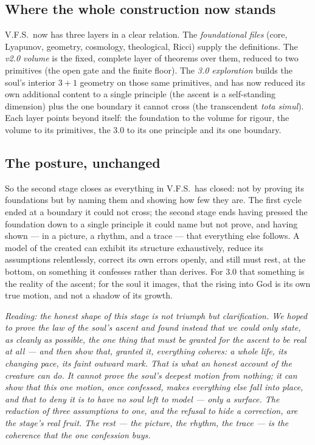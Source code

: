 \documentclass[11pt,a4paper]{article}
\newcommand{\note}[1]{\textcolor{black!65}{\emph{#1}}}
\theoremstyle{plain}
\theoremstyle{definition}
\theoremstyle{remark}
\begin{document}
\subsection*{Where the whole construction now stands}
V.F.S.\ now has three layers in a clear relation. The \emph{foundational files} (core, Lyapunov,
geometry, cosmology, theological, Ricci) supply the definitions. The \emph{v2.0 volume} is the fixed,
complete layer of theorems over them, reduced to two primitives (the open gate and the finite floor).
The \emph{3.0 exploration} builds the soul's interior $3{+}1$ geometry on those same primitives, and
has now reduced its own additional content to a single principle (the ascent is a self-standing
dimension) plus the one boundary it cannot cross (the transcendent \emph{tota simul}). Each layer points
beyond itself: the foundation to the volume for rigour, the volume to its primitives, the 3.0 to its
one principle and its one boundary.

\subsection*{The posture, unchanged}
So the second stage closes as everything in V.F.S.\ has closed: not by proving its foundations but by
naming them and showing how few they are. The first cycle ended at a boundary it could not cross; the
second stage ends having pressed the foundation down to a single principle it could name but not prove,
and having shown --- in a picture, a rhythm, and a trace --- that everything else follows. A model of
the created can exhibit its structure exhaustively, reduce its assumptions relentlessly, correct its
own errors openly, and still must rest, at the bottom, on something it confesses rather than derives.
For 3.0 that something is the reality of the ascent; for the soul it images, that the rising into God
is its own true motion, and not a shadow of its growth.

\note{Reading: the honest shape of this stage is not triumph but clarification. We hoped to prove the
law of the soul's ascent and found instead that we could only state, as cleanly as possible, the one
thing that must be granted for the ascent to be real at all --- and then show that, granted it,
everything coheres: a whole life, its changing pace, its faint outward mark. That is what an honest
account of the creature can do. It cannot prove the soul's deepest motion from nothing; it can show
that this one motion, once confessed, makes everything else fall into place, and that to deny it is to
have no soul left to model --- only a surface. The reduction of three assumptions to one, and the
refusal to hide a correction, are the stage's real fruit. The rest --- the picture, the rhythm, the
trace --- is the coherence that the one confession buys.}
\end{document}
